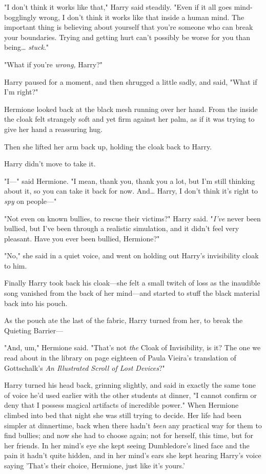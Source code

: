 "I don't think it works like that," Harry said steadily. "Even if it all goes 
mind-bogglingly wrong, I don't think it works like that inside a human mind. 
The important thing is believing about yourself that you're someone who can 
break your boundaries. Trying and getting hurt can't possibly be worse for you 
than being{\ldots} \emph{stuck}."

"What if you're \emph{wrong,} Harry?"

Harry paused for a moment, and then shrugged a little sadly, and said, "What if 
I'm right?"

Hermione looked back at the black mesh running over her hand. From the inside 
the cloak felt strangely soft and yet firm against her palm, as if it was 
trying to give her hand a reassuring hug.

Then she lifted her arm back up, holding the cloak back to Harry.

Harry didn't move to take it.

"I---" said Hermione. "I mean, thank you, thank you a lot, but I'm still 
thinking about it, so you can take it back for now. And{\ldots} Harry, I don't 
think it's right to \emph{spy} on people---"

"Not even on known bullies, to rescue their victims?" Harry said. "\emph{I've} 
never been bullied, but I've been through a realistic simulation, and it didn't 
feel very pleasant. Have you ever been bullied, Hermione?"

"No," she said in a quiet voice, and went on holding out Harry's invisibility 
cloak to him.

Finally Harry took back his cloak---she felt a small twitch of loss as the 
inaudible song vanished from the back of her mind---and started to stuff the 
black material back into his pouch.

As the pouch ate the last of the fabric, Harry turned from her, to break the 
Quieting Barrier---

"And, um," Hermione said. "That's not \emph{the} Cloak of Invisibility, is it? 
The one we read about in the library on page eighteen of Paula Vieira's 
translation of Gottschalk's \emph{An Illustrated Scroll of Lost Devices}?"

Harry turned his head back, grinning slightly, and said in exactly the same 
tone of voice he'd used earlier with the other students at dinner, "I cannot 
confirm or deny that I possess magical artifacts of incredible power."
\sbreak
When Hermione climbed into bed that night she was still trying to decide. Her 
life had been simpler at dinnertime, back when there hadn't \emph{been} any 
practical way for them to find bullies; and now she had to choose again; not 
for herself, this time, but for her friends. In her mind's eye she kept seeing 
Dumbledore's lined face and the pain it hadn't quite hidden, and in her mind's 
ears she kept hearing Harry's voice saying 'That's their choice, Hermione, just 
like it's yours.'

